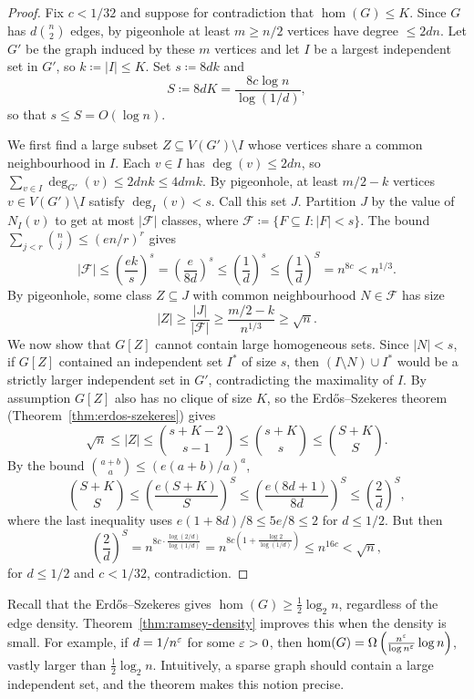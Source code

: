 \begin{proof}
  Fix $c < 1/32$ and suppose for contradiction that $\hom(G) \leq K$. Since $G$ has $d\binom{n}{2}$ edges, by pigeonhole at least $m \geq n/2$ vertices have degree $\leq 2dn$. Let $G'$ be the graph induced by these $m$ vertices and let $I$ be a largest independent set in $G'$, so $k \coloneqq |I| \leq K$. Set $s \coloneqq 8dk$ and
  \[
    S \coloneqq 8dK = \frac{8c\log n}{\log(1/d)},
  \]
  so that $s \leq S = O(\log n)$.

  We first find a large subset $Z \subseteq V(G') \setminus I$ whose vertices share a common neighbourhood in $I$. Each $v \in I$ has $\deg(v) \leq 2dn$, so $\sum_{v \in I} \deg_{G'}(v) \leq 2dnk \leq 4dmk$. By pigeonhole, at least $m/2 - k$ vertices $v \in V(G') \setminus I$ satisfy $\deg_I(v) < s$. Call this set $J$. Partition $J$ by the value of $N_I(v)$ to get at most $|\mathcal{F}|$ classes, where $\mathcal{F} \coloneqq \{F \subseteq I : |F| < s\}$. The bound $\sum_{j < r} \binom{n}{j} \leq (en/r)^{r}$ gives
  \[
    |\mathcal{F}| \leq \left(\frac{ek}{s}\right)^{s} = \left(\frac{e}{8d}\right)^{s} \leq \left(\frac{1}{d}\right)^{s} \leq \left(\frac{1}{d}\right)^{S} = n^{8c} < n^{1/3}.
  \]
  By pigeonhole, some class $Z \subseteq J$ with common neighbourhood $N \in \mathcal{F}$ has size
  \[
    |Z| \geq \frac{|J|}{|\mathcal{F}|} \geq \frac{m/2 - k}{n^{1/3}} \geq \sqrt{n}.
  \]
  We now show that $G[Z]$ cannot contain large homogeneous sets. Since $|N| < s$, if $G[Z]$ contained an independent set $I^*$ of size $s$, then $(I \setminus N) \cup I^*$ would be a strictly larger independent set in $G'$, contradicting the maximality of $I$. By assumption $G[Z]$ also has no clique of size $K$, so the Erd\H{o}s--Szekeres theorem (Theorem~\ref{thm:erdos-szekeres}) gives
  \[
    \sqrt{n} \leq |Z| \leq \binom{s + K - 2}{s - 1} \leq \binom{s + K}{s} \leq \binom{S + K}{S}.
  \]
  By the bound $\binom{a + b}{a} \leq (e(a + b)/a)^{a}$,
  \[
    \binom{S + K}{S} \leq \left(\frac{e(S + K)}{S}\right)^{S} \leq \left(\frac{e(8d + 1)}{8d}\right)^{S} \leq \left(\frac{2}{d}\right)^{S},
  \]
  where the last inequality uses $e(1 + 8d)/8 \leq 5e/8 \leq 2$ for $d \leq 1/2$. But then
  \[
    \left(\frac{2}{d}\right)^{S} = n^{8c \cdot \frac{\log (2/d)}{\log(1/d)}} = n^{8c\left(1 + \frac{\log 2}{\log(1/d)}\right)} \leq n^{16c} < \sqrt{n},
  \]
  for $d \leq 1/2$ and $c < 1/32$, contradiction.
\end{proof}

Recall that the Erd\H{o}s--Szekeres gives $\hom(G) \geq \frac{1}{2} \log_2 n$, regardless of the edge density. Theorem~\ref{thm:ramsey-density} improves this when the density is small. For example, if $d = 1/n^{\varepsilon}$ for some $\varepsilon > 0$, then $\hom(G) = \Omega\left(\frac{n^{\varepsilon}}{\log n^{\varepsilon}} \log n\right)$, vastly larger than $\frac{1}{2}\log_2 n$. Intuitively, a sparse graph should contain a large independent set, and the theorem makes this notion precise. 

